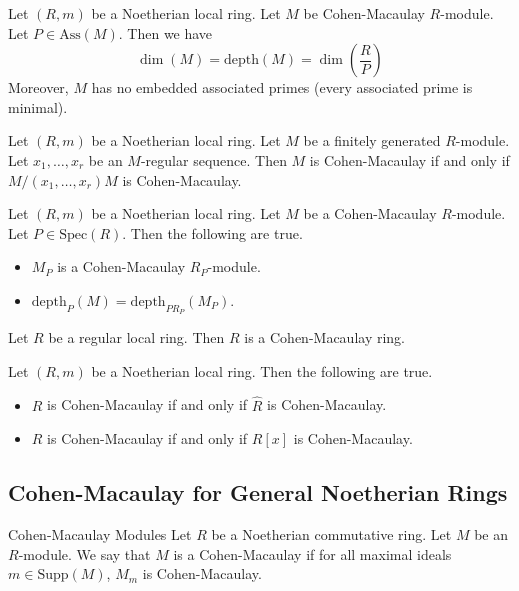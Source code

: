 \documentclass[a4paper]{article}
\begin{document}
\begin{prp}{}{} Let $(R,m)$ be a Noetherian local ring. Let $M$ be Cohen-Macaulay $R$-module. Let $P\in\text{Ass}(M)$. Then we have $$\dim(M)=\text{depth}(M)=\dim\left(\frac{R}{P}\right)$$ Moreover, $M$ has no embedded associated primes (every associated prime is minimal). 
\end{prp}

\begin{prp}{}{} Let $(R,m)$ be a Noetherian local ring. Let $M$ be a finitely generated $R$-module. Let $x_1,\dots,x_r$ be an $M$-regular sequence. Then $M$ is Cohen-Macaulay if and only if $M/(x_1,\dots,x_r)M$ is Cohen-Macaulay. 
\end{prp}

\begin{prp}{}{} Let $(R,m)$ be a Noetherian local ring. Let $M$ be a Cohen-Macaulay $R$-module. Let $P\in\text{Spec}(R)$. Then the following are true. 
\begin{itemize}
\item $M_P$ is a Cohen-Macaulay $R_P$-module. 
\item $\text{depth}_P(M)=\text{depth}_{PR_P}(M_P)$. 
\end{itemize}
\end{prp}

\begin{lmm}{}{} Let $R$ be a regular local ring. Then $R$ is a Cohen-Macaulay ring. 
\end{lmm}

\begin{prp}{}{} Let $(R,m)$ be a Noetherian local ring. Then the following are true. 
\begin{itemize}
\item $R$ is Cohen-Macaulay if and only if $\widehat{R}$ is Cohen-Macaulay. 
\item $R$ is Cohen-Macaulay if and only if $R[x]$ is Cohen-Macaulay. 
\end{itemize}
\end{prp}

\subsection{Cohen-Macaulay for General Noetherian Rings}
\begin{defn}{Cohen-Macaulay Modules}{} Let $R$ be a Noetherian commutative ring. Let $M$ be an $R$-module. We say that $M$ is a Cohen-Macaulay if for all maximal ideals $m\in\text{Supp}(M)$, $M_m$ is Cohen-Macaulay. 
\end{defn}
\end{document}
